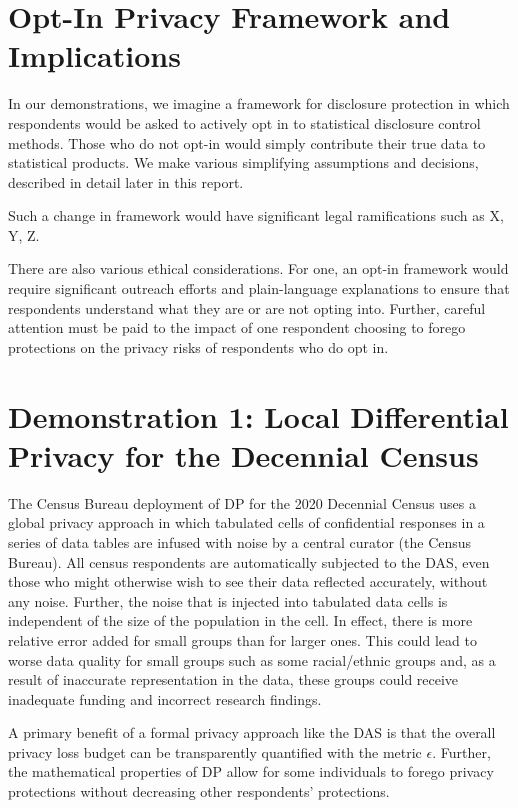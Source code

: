\documentclass[
]{urban-formatting}
\begin{document}
\section{Opt-In Privacy Framework and Implications}

In our demonstrations, we imagine a framework for disclosure protection
in which respondents would be asked to actively opt in to statistical
disclosure control methods. Those who do not opt-in would simply
contribute their true data to statistical products. We make various
simplifying assumptions and decisions, described in detail later in this
report.~

Such a change in framework would have significant legal ramifications
such as X, Y, Z.~

There are also various ethical considerations. For one, an opt-in
framework would require significant outreach efforts and plain-language
explanations to ensure that respondents understand what they are or are
not opting into. Further, careful attention must be paid to the impact
of one respondent choosing to forego protections on the privacy risks of
respondents who do opt in.~

\section{Demonstration 1: Local Differential Privacy for the Decennial Census}

The Census Bureau deployment of DP for the 2020 Decennial Census uses a
global privacy approach in which tabulated cells of confidential
responses in a series of data tables are infused with noise by a central
curator (the Census Bureau). All census respondents are automatically
subjected to the DAS, even those who might otherwise wish to see their
data reflected accurately, without any noise. Further, the noise that is
injected into tabulated data cells is independent of the size of the
population in the cell. In effect, there is more relative error added
for small groups than for larger ones. This could lead to worse data
quality for small groups such as some racial/ethnic groups and, as a
result of inaccurate representation in the data, these groups could
receive inadequate funding and incorrect research findings.~

A primary benefit of a formal privacy approach like the DAS is that the
overall privacy loss budget can be transparently quantified with the
metric \(\epsilon\). Further, the mathematical properties of DP allow
for some individuals to forego privacy protections without decreasing
other respondents' protections.~
\end{document}
